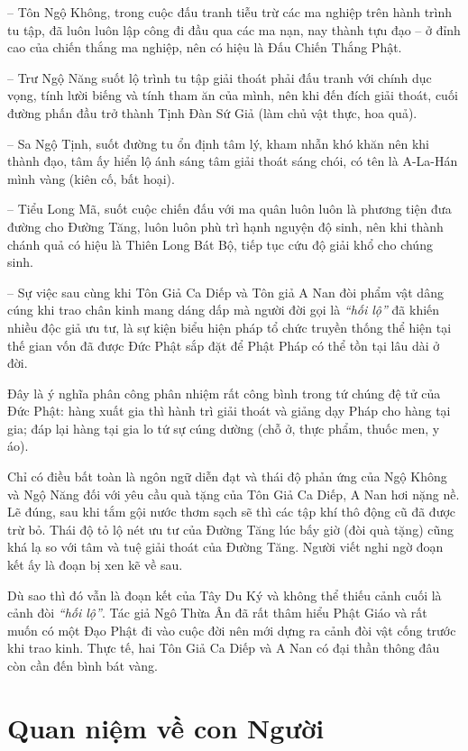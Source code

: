 -- Tôn Ngộ Không, trong cuộc đấu tranh tiễu trừ các ma nghiệp trên hành trình tu tập, đã luôn luôn lập công đi đầu qua các ma nạn, nay thành tựu đạo -- ở đỉnh cao của chiến thắng ma nghiệp, nên có hiệu là Đấu Chiến Thắng Phật.

-- Trư Ngộ Năng suốt lộ trình tu tập giải thoát phải đấu tranh với chính dục vọng, tính lười biếng và tính tham ăn của mình, nên khi đến đích giải thoát, cuối đường phấn đầu trở thành Tịnh Đàn Sứ Giả (làm chủ vật thực, hoa quả).

-- Sa Ngộ Tịnh, suốt đường tu ổn định tâm lý, kham nhẫn khó khăn nên khi thành đạo, tâm ấy hiển lộ ánh sáng tâm giải thoát sáng chói, có tên là A-La-Hán mình vàng (kiên cố, bất hoại).

-- Tiểu Long Mã, suốt cuộc chiến đấu với ma quân luôn luôn là phương tiện đưa đường cho Đường Tăng, luôn luôn phù trì hạnh nguyện độ sinh, nên khi thành chánh quả có hiệu là Thiên Long Bát Bộ, tiếp tục cứu độ giải khổ cho chúng sinh.

-- Sự việc sau cùng khi Tôn Giả Ca Diếp và Tôn giả A Nan đòi phẩm vật dâng cúng khi trao chân kinh mang dáng dấp mà người đời gọi là \emph{``hối lộ''} đã khiến nhiều độc giả ưu tư, là sự kiện biểu hiện pháp tổ chức truyền thống thể hiện tại thế gian vốn đã được Đức Phật sắp đặt để Phật Pháp có thể tồn tại lâu dài ở đời.

Đây là ý nghĩa phân công phân nhiệm rất công bình trong tứ chúng đệ tử của Đức Phật: hàng xuất gia thì hành trì giải thoát và giảng dạy Pháp cho hàng tại gia; đáp lại hàng tại gia lo tứ sự cúng dường (chỗ ở, thực phẩm, thuốc men, y áo).

Chỉ có điều bất toàn là ngôn ngữ diễn đạt và thái độ phản ứng của Ngộ Không và Ngộ Năng đối với yêu cầu quà tặng của Tôn Giả Ca Diếp, A Nan hơi nặng nề. Lẽ đúng, sau khi tắm gội nước thơm sạch sẽ thì các tập khí thô động cũ đã được trừ bỏ. Thái độ tỏ lộ nét ưu tư của Đường Tăng lúc bấy giờ (đòi quà tặng) cũng khá lạ so với tâm và tuệ giải thoát của Đường Tăng. Người viết nghi ngờ đoạn kết ấy là đoạn bị xen kẽ về sau.

Dù sao thì đó vẫn là đoạn kết của Tây Du Ký và không thể thiếu cảnh cuối là cảnh đòi \emph{``hối lộ''}. Tác giả Ngô Thừa Ân đã rất thâm hiểu Phật Giáo và rất muốn có một Đạo Phật đi vào cuộc đời nên mới dựng ra cảnh đòi vật cống trước khi trao kinh. Thực tế, hai Tôn Giả Ca Diếp và A Nan có đại thần thông đâu còn cần đến bình bát vàng.

\section{Quan niệm về con Người} %
\label{sec:98_99_100_con_nguoi}


